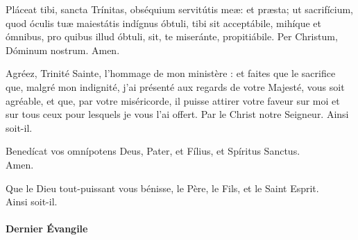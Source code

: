 \documentclass[twoside]{article}
\begin{document}
\begin{paracol}{2}

Pláceat tibi, sancta Trínitas, obséquium servitútis meæ: et præsta; ut sacrifícium, quod óculis tuæ maiestátis indígnus óbtuli, tibi sit acceptábile, mihíque et ómnibus, pro quibus illud óbtuli, sit, te miseránte, propitiábile. Per Christum, Dóminum nostrum. Amen.

\switchcolumn

Agréez, Trinité Sainte, l’hommage de mon ministère : et faites que le sacriﬁce que, malgré mon indignité, j’ai présenté aux regards de votre Majesté, vous soit agréable, et que, par votre miséricorde, il puisse attirer votre faveur sur moi et sur tous ceux pour lesquels je vous l’ai offert. Par le Christ notre Seigneur. Ainsi soit-il.

\switchcolumn*

Benedícat vos omnípotens Deus,
Pater, et Fílius, \cc et Spíritus Sanctus. \\
\rr Amen.

\switchcolumn

Que le Dieu tout-puissant vous bénisse,
le Père, le Fils, et le Saint Esprit.\\
\rr Ainsi soit-il.

\end{paracol}
\newpage
\paragraph{Dernier Évangile}
\end{document}
